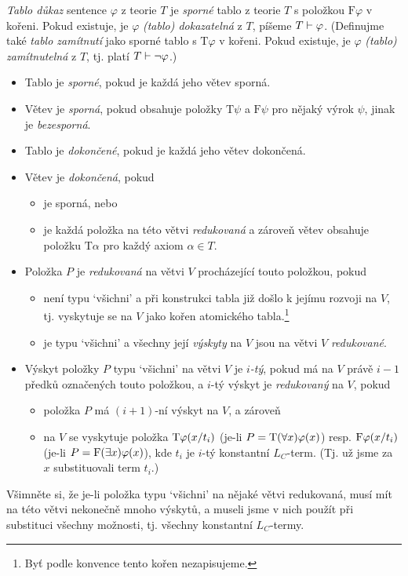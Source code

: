 \begin{definition}
    \emph{Tablo důkaz} sentence $\varphi$ z teorie $T$ je \emph{sporné} tablo z teorie $T$ s položkou $\mathrm{F}\varphi$ v kořeni. Pokud existuje, je $\varphi$ \emph{(tablo) dokazatelná} z $T$, píšeme $T\vdash\varphi$. (Definujme také \emph{tablo zamítnutí} jako sporné tablo s $\mathrm{T}\varphi$ v kořeni. Pokud existuje, je $\varphi$ \emph{(tablo) zamítnutelná} z $T$, tj. platí $T\vdash\neg\varphi$.)  
    \begin{itemize}
        \item Tablo je \emph{sporné}, pokud je každá jeho větev sporná.
        \item Větev je \emph{sporná}, pokud obsahuje položky $\mathrm{T}\psi$ a $\mathrm{F}\psi$ pro nějaký výrok $\psi$, jinak je \emph{bezesporná}.
        \item Tablo je \emph{dokončené}, pokud je každá jeho větev dokončená.
        \item Větev je \emph{dokončená}, pokud 
        \begin{itemize}
            \item je sporná, nebo
            \item je každá položka na této větvi \emph{redukovaná} a zároveň větev obsahuje položku $\mathrm{T}\alpha$ pro každý axiom $\alpha\in T$.
        \end{itemize}
         
        \item Položka $P$ je \emph{redukovaná} na větvi $V$ procházející touto položkou, pokud 
        \begin{itemize}
            \item není typu `všichni' a při konstrukci tabla již došlo k jejímu rozvoji na $V$, tj. vyskytuje se na $V$ jako kořen atomického tabla.\footnote{Byť podle konvence tento kořen nezapisujeme.}
            \item je typu `všichni' a všechny její \emph{výskyty} na $V$ jsou na větvi $V$ \emph{redukované}.
        \end{itemize}
        \item Výskyt položky $P$ typu `všichni' na větvi $V$ je \emph{$i$-tý}, pokud má na $V$ právě $i-1$ předků označených touto položkou, a $i$-tý výskyt je \emph{redukovaný} na $V$, pokud
        \begin{itemize}
            \item položka $P$ má $(i+1)$-ní výskyt na $V$, a zároveň
            \item na $V$ se vyskytuje položka $\mathrm{T}\varphi(x/t_i)$ (je-li $P=\mathrm{T}(\forall x)\varphi(x)$) resp. $\mathrm{F}\varphi(x/t_i)$ (je-li $P=\mathrm{F}(\exists x)\varphi(x)$), kde $t_i$ je $i$-tý konstantní $L_C$-term. (Tj. už jsme za $x$ substituovali term $t_i$.)
        \end{itemize} 
    \end{itemize}
\end{definition}
Všimněte si, že je-li položka typu `všichni' na nějaké větvi redukovaná, musí mít na této větvi nekonečně mnoho výskytů, a museli jsme v nich použít při substituci všechny možnosti, tj. všechny konstantní $L_C$-termy.
    

